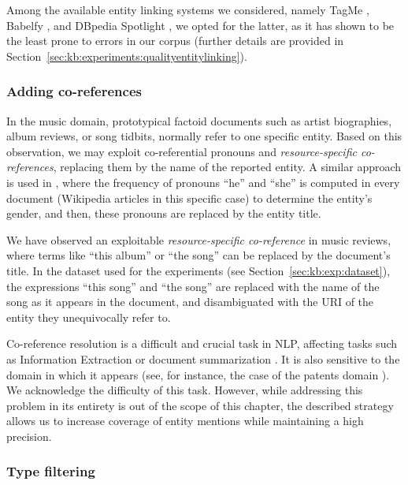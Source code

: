 Among the available entity linking systems we considered, namely TagMe \citep{Ferraginaetal2010}, Babelfy \citep{Moroetal2014}, and DBpedia Spotlight \citep{Mendes2011}, we opted for the latter, as it has shown to be the least prone to errors in our corpus (further details are provided in Section~\ref{sec:kb:experiments:qualityentitylinking}).

\subsubsection{Adding co-references}

In the music domain, prototypical factoid documents such as artist biographies, album reviews, or song tidbits, normally refer to one specific entity. Based on this observation, we may exploit co-referential pronouns and \textit{resource-specific co-references}, replacing them by the name of the reported entity.
A similar approach is used in \cite{Voskarides2015}, where the frequency of pronouns ``he'' and ``she'' is computed in every document (Wikipedia articles in this specific case) to determine the entity's gender, and then, these pronouns are replaced by the entity title. %

We have observed an exploitable \textit{resource-specific co-reference} in music reviews, where terms like ``this album'' or ``the song'' can be replaced by the document's title. In the dataset used for the experiments (see Section~\ref{sec:kb:exp:dataset}), the expressions ``this song'' and ``the song'' are replaced with the name of the song as it appears in the document, and disambiguated with the URI of the entity they unequivocally refer to.

Co-reference resolution is a difficult and crucial task in NLP, affecting tasks such as Information Extraction \citep{Soon2001} or document summarization \citep{saggion2004multi}. It is also sensitive to the domain in which it appears (see, for instance, the case of the patents domain \citep{Bouayad2014}). We acknowledge the difficulty of this task. However, while addressing this problem in its entirety is out of the scope of this chapter, the described strategy allows us to increase coverage of entity mentions while maintaining a high precision.



\subsubsection{Type filtering}
\label{sec:kb:typefiltering}

